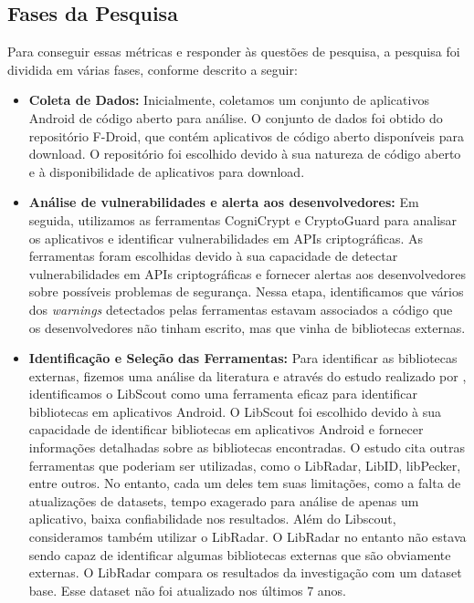 \subsection{Fases da Pesquisa}

Para conseguir essas métricas e responder às questões de pesquisa, a pesquisa foi dividida em várias fases, conforme descrito a seguir:

\begin{itemize}
\item \textbf{Coleta de Dados:} Inicialmente, coletamos um conjunto de aplicativos Android de código aberto para análise. O conjunto de dados foi obtido do repositório F-Droid, que contém aplicativos de código aberto disponíveis para download. O repositório foi escolhido devido à sua natureza de código aberto e à disponibilidade de aplicativos para download.

\item \textbf{Análise de vulnerabilidades e alerta aos desenvolvedores:} Em seguida, utilizamos as ferramentas CogniCrypt e CryptoGuard para analisar os aplicativos e identificar vulnerabilidades em APIs criptográficas. As ferramentas foram escolhidas devido à sua capacidade de detectar vulnerabilidades em APIs criptográficas e fornecer alertas aos desenvolvedores sobre possíveis problemas de segurança. Nessa etapa, identificamos que vários dos \textit{warnings} detectados pelas ferramentas estavam associados a código que os desenvolvedores não tinham escrito, mas que vinha de bibliotecas externas. 

\item \textbf{Identificação e Seleção das Ferramentas:} Para identificar as bibliotecas externas, fizemos uma análise da literatura e através do estudo realizado por \cite{api_tpl_zhang}, identificamos o LibScout como uma ferramenta eficaz para identificar bibliotecas em aplicativos Android. O LibScout foi escolhido devido à sua capacidade de identificar bibliotecas em aplicativos Android e fornecer informações detalhadas sobre as bibliotecas encontradas. O estudo cita outras ferramentas que poderiam ser utilizadas, como o LibRadar, LibID, libPecker, entre outros. No entanto, cada um deles tem suas limitações, como a falta de atualizações de datasets, tempo exagerado para análise de apenas um aplicativo, baixa confiabilidade nos resultados. Além do Libscout, consideramos também utilizar o LibRadar. O LibRadar no entanto não estava sendo capaz de identificar algumas bibliotecas externas que são obviamente externas. O LibRadar compara os resultados da investigação com um dataset base. Esse dataset não foi atualizado nos últimos 7 anos. 


\end{itemize}
